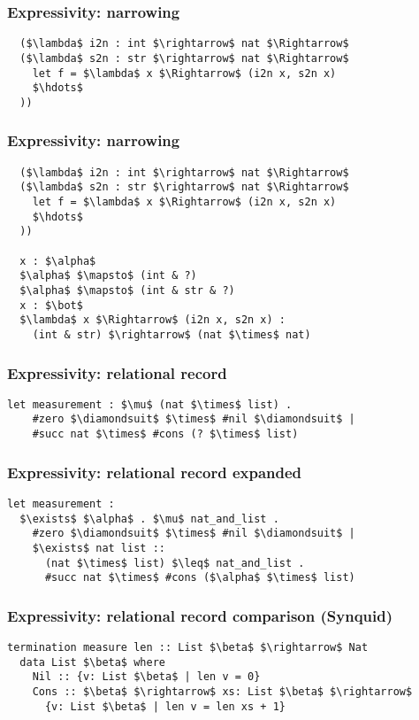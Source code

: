 \documentclass{beamer}
\begin{document}
\begin{frame}[fragile]
  \frametitle{Expressivity: narrowing}

  \begin{lstlisting}
  ($\lambda$ i2n : int $\rightarrow$ nat $\Rightarrow$ 
  ($\lambda$ s2n : str $\rightarrow$ nat $\Rightarrow$ 
    let f = $\lambda$ x $\Rightarrow$ (i2n x, s2n x)
    $\hdots$
  ))
  \end{lstlisting}
\end{frame}

\begin{frame}[fragile]
  \frametitle{Expressivity: narrowing}

  \begin{lstlisting}
  ($\lambda$ i2n : int $\rightarrow$ nat $\Rightarrow$ 
  ($\lambda$ s2n : str $\rightarrow$ nat $\Rightarrow$ 
    let f = $\lambda$ x $\Rightarrow$ (i2n x, s2n x)
    $\hdots$
  ))
  
  x : $\alpha$
  $\alpha$ $\mapsto$ (int & ?)
  $\alpha$ $\mapsto$ (int & str & ?)
  x : $\bot$
  $\lambda$ x $\Rightarrow$ (i2n x, s2n x) : 
    (int & str) $\rightarrow$ (nat $\times$ nat) 
  \end{lstlisting}
\end{frame}

\begin{frame}[fragile]
  \frametitle{Expressivity: relational record}

  \begin{lstlisting}[]
  let measurement : $\mu$ (nat $\times$ list) .
    #zero $\diamondsuit$ $\times$ #nil $\diamondsuit$ | 
    #succ nat $\times$ #cons (? $\times$ list)
  \end{lstlisting} 

\end{frame}

\begin{frame}[fragile]
  \frametitle{Expressivity: relational record expanded}

  \begin{lstlisting}[]
  let measurement : 
  $\exists$ $\alpha$ . $\mu$ nat_and_list .
    #zero $\diamondsuit$ $\times$ #nil $\diamondsuit$ | 
    $\exists$ nat list :: 
      (nat $\times$ list) $\leq$ nat_and_list .
      #succ nat $\times$ #cons ($\alpha$ $\times$ list)
  \end{lstlisting}

\end{frame}

\begin{frame}[fragile]
  \frametitle{Expressivity: relational record comparison (Synquid)}

  \begin{lstlisting}[keywords={termination, measure, data, where}]
  termination measure len :: List $\beta$ $\rightarrow$ Nat 
  data List $\beta$ where
    Nil :: {v: List $\beta$ | len v = 0}
    Cons :: $\beta$ $\rightarrow$ xs: List $\beta$ $\rightarrow$ 
      {v: List $\beta$ | len v = len xs + 1}

  \end{lstlisting}
\end{frame}
\end{document}
